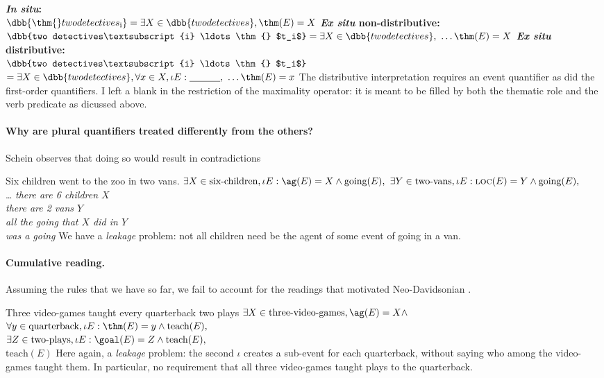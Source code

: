 \pex
\a 
\textbf{\emph{In situ}:}\\
$\dbb{\thm{} two detectives\textsubscript{i}} = \exists X\in\dbb{two detectives}, \thm(E) = X$
\a 
\textbf{\emph{Ex situ} non-distributive:}\\
$\dbb{two detectives\textsubscript{i} \ldots \thm{} $t_i$} = \exists X\in\dbb{two detectives},\ \ldots \thm(E) = X$
\a 
\textbf{\emph{Ex situ} distributive:}\\
$\dbb{two detectives\textsubscript{i} \ldots \thm{} $t_i$}$\\
$ = \exists X\in\dbb{two detectives},\forall x\in X, \iota E: \underline{\hphantom{aaaaaa}},\ \ldots \thm(E) = x$
\xe
%
The distributive interpretation requires an event quantifier as did the first-order quantifiers. I left a blank in the restriction of the maximality operator: it is meant to be filled by both the thematic role and the verb predicate as dicussed above.	

\paragraph{Why are plural quantifiers treated differently from the others?}
Schein observes that doing so would result in contradictions

\pex
\a 
Six children went to the zoo in two vans.
\a 
$\exists X\in \text{six-children}, \iota E: \ag(E) = X \wedge \text{going}(E),$
$\exists Y\in \text{two-vans}, \iota E: \textsc{loc}(E) = Y \wedge \text{going}(E),$\\
\ldots
\a
\emph{there are 6 children $X$}\\
\emph{there are 2 vans $Y$}\\
\emph{all the going that $X$ did in $Y$}\\
\emph{was a going}
\xe
%
We have a \emph{leakage} problem: not all children need be the agent of some event of going in a van.

\paragraph{Cumulative reading.}
Assuming the rules that we have so far, we fail to account for the readings that motivated Neo-Davidsonian .

\pex
\a 
Three video-games taught every quarterback two plays
\a 
$\exists X\in \text{three-video-games}, \ag(E) = X \wedge $\\
$\forall y\in \text{quarterback}, \iota E: \thm(E) = y \wedge \text{teach}(E),$\\
$\exists Z\in \text{two-plays}, \iota E: \goal(E) = Z \wedge \text{teach}(E),$\\
$\text{teach}(E)$
\xe
%
Here again, a \emph{leakage} problem: the second $\iota$ creates a sub-event for each quarterback, without saying who among the video-games taught them. In particular, no requirement that all three video-games taught plays to the quarterback.

